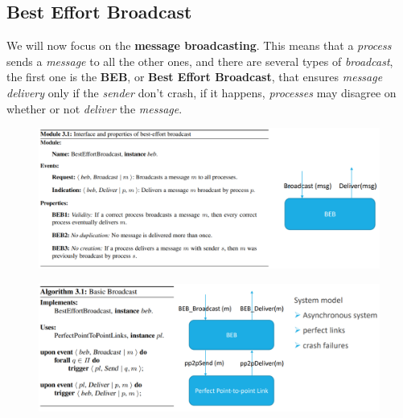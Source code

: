 \documentclass{article}
\begin{document}
\subsection{Best Effort Broadcast}
We will now focus on the \textbf{message broadcasting}. This means that a \emph{process} sends a \emph{message} to all the other ones, and there are several types of \emph{broadcast}, the first one is the \textbf{BEB}, or \textbf{Best Effort Broadcast}, that ensures \emph{message delivery} only if the \emph{sender} don't crash, if it happens, \emph{processes} may disagree on whether or not \emph{deliver} the \emph{message}.
\begin{figure}[H]
  \centering
  \includegraphics[scale=1,left]{cattura30.png}
\end{figure}
\begin{figure}[H]
  \centering
  \includegraphics[scale=1,left]{cattura31.png}
\end{figure}
\clearpage
\end{document}
